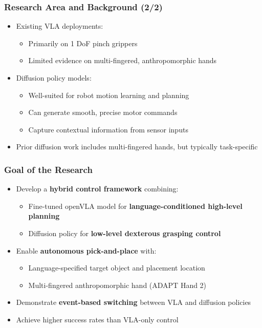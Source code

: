 \documentclass{beamer}
\begin{document}
\begin{frame}
  \frametitle{Research Area and Background (2/2)}
  \small
  \begin{itemize}
    \item Existing VLA deployments:
      \begin{itemize}
        \item Primarily on 1 DoF pinch grippers
        \item Limited evidence on multi-fingered, anthropomorphic hands
      \end{itemize}
    \item Diffusion policy models:
      \begin{itemize}
        \item Well-suited for robot motion learning and planning
        \item Can generate smooth, precise motor commands
        \item Capture contextual information from sensor inputs
      \end{itemize}
    \item Prior diffusion work includes multi-fingered hands, but typically task-specific
  \end{itemize}
\end{frame}

\begin{frame}
  \frametitle{Goal of the Research}
  \small
  \begin{itemize}
    \item Develop a \textbf{hybrid control framework} combining:
      \begin{itemize}
        \item Fine-tuned openVLA model for \textbf{language-conditioned high-level planning}
        \item Diffusion policy for \textbf{low-level dexterous grasping control}
      \end{itemize}
    \item Enable \textbf{autonomous pick-and-place} with:
      \begin{itemize}
        \item Language-specified target object and placement location
        \item Multi-fingered anthropomorphic hand (ADAPT Hand 2)
      \end{itemize}
    \item Demonstrate \textbf{event-based switching} between VLA and diffusion policies
    \item Achieve higher success rates than VLA-only control
  \end{itemize}
\end{frame}
\end{document}
